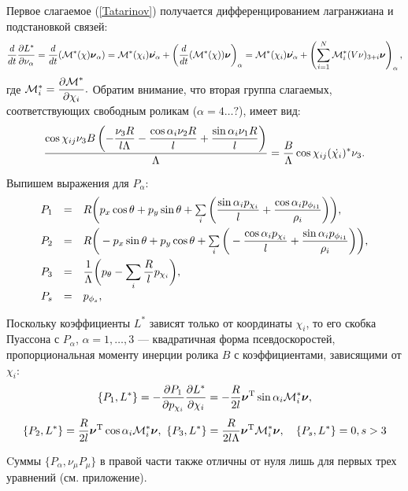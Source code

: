 Первое слагаемое (\ref{Tatarinov}) получается дифференцированием лагранжиана и подстановкой связей:
\begin{equation}
    \frac{d}{dt}\frac{\partial L^{*}}{\partial \nu_\alpha} = \frac{d}{dt}(\mathcal{M}^*(\chi)\boldsymbol{\mathbf{\nu}}_\alpha) = 
    \mathcal{M}^*(\chi_i)\dot{\boldsymbol{\mathbf{\nu}}_\alpha} +
    \left(\frac{d}{dt}(\mathcal{M}^*(\chi))\boldsymbol{\mathbf{\nu}}\right)_\alpha =
    \mathcal{M}^*(\chi_i)\dot{\boldsymbol{\mathbf{\nu}}_\alpha} +
    \left(\sum_{i=1}^{N}\mathcal{M}^*_i(V\nu)_{3+i}\boldsymbol{\mathbf{\nu}}\right)_\alpha,
\end{equation}
где $\mathcal{M}^*_i = \displaystyle\frac{\displaystyle \partial \mathcal{M}^*}{\displaystyle \partial \chi_i}.$ Обратим внимание, что вторая группа слагаемых, соответствующих свободным роликам ($\alpha = 4\dots ?$),  имеет вид:
\begin{equation}
    \frac{\cos\chi_{ij} \nu_3 B \left( -\displaystyle\frac{\displaystyle \nu_3 R}{\displaystyle l \Lambda}-\displaystyle\frac{\displaystyle \cos\alpha_i \nu_2 R}{\displaystyle l}+\displaystyle\frac{\displaystyle \sin\alpha_i \nu_1 R}{\displaystyle l}\right) }{\Lambda} = \frac{B}{\Lambda}\cos\chi_{ij}(\dot{\chi_i})^*\nu_3.
\end{equation}
 
Выпишем выражения для $P_\alpha$:
\begin{equation}\label{P}
    \begin{array}{rcl}
        P_1 & = & R\bigg(p_x\cos\theta + p_y\sin\theta + \sum\limits_{i}\bigg(\ddfrac{\sin\alpha_ip_{\chi_i}}{l} +  \ddfrac{\cos\alpha_ip_{\phi_{i1}}}{\rho_i}\bigg)\bigg),\vsp
        P_2 & = & R\bigg(-p_x\sin\theta + p_y\cos\theta + \sum\limits_{i}\bigg(-\ddfrac{\cos\alpha_ip_{\chi_i}}{l} +  \ddfrac{\sin\alpha_ip_{\phi_{i1}}}{\rho_i}\bigg)\bigg),\vsp
        P_3 & = & \ddfrac{1}{\Lambda}\bigg(p_\theta - \sum\limits_{i}\ddfrac{R}{l}p_{\chi_i}\bigg),\vsp
        P_s & = & p_{\phi_s},
    \end{array}
\end{equation}

Поскольку коэффициенты  $L^{*}$ зависят только от координаты $\chi_i$, то его скобка Пуассона с $P_\alpha$, $\alpha=1,\dots, 3$ --- квадратичная форма псевдоскоростей, пропорциональная моменту инерции ролика $B$ с коэффициентами, зависящими от $\chi_i$:
$$
\{P_1, L^*\} = -\frac{\partial P_1}{\partial p_{\chi_i}}\frac{\partial L^*}{\partial \chi_i} = -\frac{R}{2l}\boldsymbol{\mathbf{\nu}}^\mathrm{T}\sin\alpha_i\mathcal{M}^*_i\boldsymbol{\mathbf{\nu}},
$$
$$
\{P_2, L^*\} = \frac{R}{2l}\boldsymbol{\mathbf{\nu}}^\mathrm{T}\cos\alpha_i\mathcal{M}^*_i\boldsymbol{\mathbf{\nu}},\  
\{P_3, L^*\} = \frac{R}{2l\Lambda}\boldsymbol{\mathbf{\nu}}^\mathrm{T}\mathcal{M}^*_i\boldsymbol{\mathbf{\nu}},\quad \{P_s,L^*\} = 0, s>3
$$

Cуммы $\{P_\alpha, \nu_\mu P_\mu\}$ в правой части также отличны от нуля лишь для первых трех уравнений (см. приложение).

